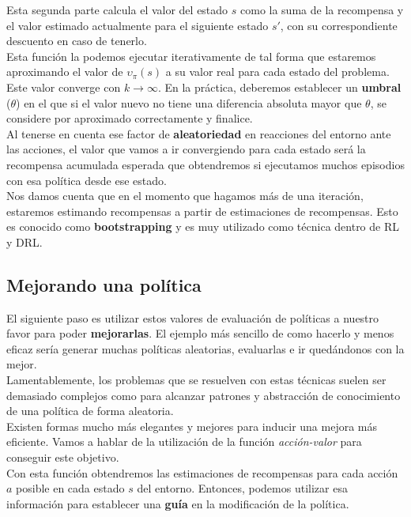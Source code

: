 \documentclass[11pt,fleqn]{book} %
\begin{document}
Esta segunda parte calcula el valor del estado $s$ como la suma de la recompensa y el valor estimado actualmente para el siguiente estado $s'$, con su correspondiente descuento en caso de tenerlo. \\

Esta función la podemos ejecutar iterativamente de tal forma que estaremos aproximando el valor de $\upsilon_\pi(s)$ a su valor real para cada estado del problema. Este valor converge con $k \rightarrow \infty$. En la práctica, deberemos establecer un \textbf{umbral} ($\theta$) en el que si el valor nuevo no tiene una diferencia absoluta mayor que $\theta$, se considere por aproximado correctamente y finalice. \\

Al tenerse en cuenta ese factor de \textbf{aleatoriedad} en reacciones del entorno ante las acciones, el valor que vamos a ir convergiendo para cada estado será la recompensa acumulada esperada que obtendremos si ejecutamos muchos episodios con esa política desde ese estado. \\

Nos damos cuenta que en el momento que hagamos más de una iteración, estaremos estimando recompensas a partir de estimaciones de recompensas. Esto es conocido como \textbf{bootstrapping} y es muy utilizado como técnica dentro de RL y DRL.

\subsection{Mejorando una política}

El siguiente paso es utilizar estos valores de evaluación de políticas a nuestro favor para poder \textbf{mejorarlas}. El ejemplo más sencillo de como hacerlo y menos eficaz sería generar muchas políticas aleatorias, evaluarlas e ir quedándonos con la mejor. \\

Lamentablemente, los problemas que se resuelven con estas técnicas suelen ser demasiado complejos como para alcanzar patrones y abstracción de conocimiento de una política de forma aleatoria. \\

Existen formas mucho más elegantes y mejores para inducir una mejora más eficiente. Vamos a hablar de la utilización de la función \textit{acción-valor} para conseguir este objetivo. \\

Con esta función obtendremos las estimaciones de recompensas para cada acción $a$ posible en cada estado $s$ del entorno. Entonces, podemos utilizar esa información para establecer una \textbf{guía} en la modificación de la política. \\
\end{document}
